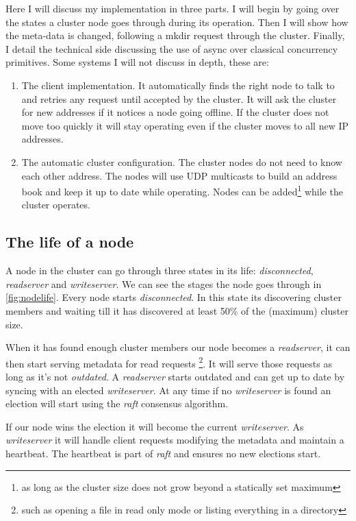 Here I will discuss my implementation in three parts. I will begin by going over the states a cluster node goes through during its operation. Then I will show how the meta-data is changed, following a mkdir request through the cluster. Finally, I detail the technical side discussing the use of async over classical concurrency primitives.
Some systems I will not discuss in depth, these are:

\begin{enumerate}
	\item The client implementation. It automatically finds the right node to talk to and retries any request until accepted by the cluster. It will ask the cluster for new addresses if it notices a node going offline. If the cluster does not move too quickly it will stay operating even if the cluster moves to all new IP addresses.
	\item The automatic cluster configuration. The cluster nodes do not need to know each other address. The nodes will use UDP multicasts to build an address book and keep it up to date while operating. Nodes can be added\footnote{as long as the cluster size does not grow beyond a statically set maximum} while the cluster operates.
\end{enumerate}

\subsection{The life of a node}
A node in the cluster can go through three states in its life: \textit{disconnected}, \textit{readserver} and \textit{writeserver}. We can see the stages the node goes through in \cref{fig:nodelife}. Every node starts \textit{disconnected}. In this state its discovering cluster members and waiting till it has discovered at least 50\% of the (maximum) cluster size. 

When it has found enough cluster members our node becomes a \textit{readserver}, it can then start serving metadata for read requests \footnote{such as opening a file in read only mode or listing everything in a directory}. It will serve those requests as long as it's not \textit{outdated}. A \textit{readserver} starts outdated and can get up to date by syncing with an elected \textit{writeserver}. At any time if no \textit{writeserver} is found an election will start using the \textit{raft}\cite{raft} consensus algorithm. 

If our node wins the election it will become the current \textit{writeserver}. As \textit{writeserver} it will handle client requests modifying the metadata and maintain a heartbeat. The heartbeat is part of \textit{raft} and ensures no new elections start.

